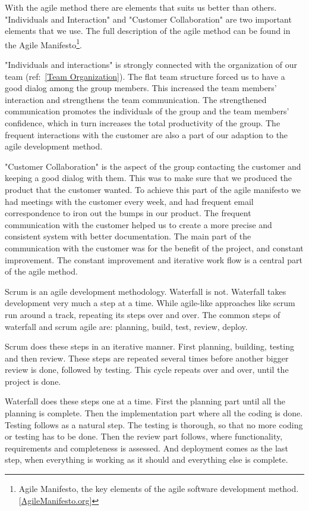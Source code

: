     With the agile method there are elements that suits us better than others. "Individuals and Interaction" and "Customer Collaboration" are two important elements that we use. The full description of the agile method can be found in the Agile Manifesto\footnote
        {Agile Manifesto, the key elements of the agile software development method. [\href{http://http://agilemanifesto.org/}{AgileManifesto.org}]}.
    
    "Individuals and interactions" is strongly connected with the organization of our team (ref:~\ref{Team Organization}). The flat team structure forced us to have a good dialog among the group members. This increased the team members' interaction and strengthens the team communication. The strengthened communication promotes the individuals of the group and the team members' confidence, which in turn increases the total productivity of the group. The frequent interactions with the customer are also a part of our adaption to the agile development method. 
    
    "Customer Collaboration" is the aspect of the group contacting the customer and keeping a good dialog with them. This was to make sure that we produced the product that the customer wanted. To achieve this part of the agile manifesto we had meetings with the customer every week, and had frequent email correspondence to iron out the bumps in our product. The frequent communication with the customer helped us to create a more precise and consistent system with better documentation. The main part of the communication with the customer was for the benefit of the project, and constant improvement. The constant improvement and iterative work flow is a central part of the agile method. 
    
    Scrum is an agile development methodology. Waterfall is not. Waterfall takes development very much a step at a time. While agile-like approaches like scrum run around a track, repeating its steps over and over. The common steps of waterfall and scrum agile are: planning, build, test, review, deploy. 
               
    Scrum does these steps in an iterative manner. First planning, building, testing and then review. These steps are repeated several times before another bigger review is done, followed by testing. This cycle repeats over and over, until the project is done. 
    
    Waterfall  does these steps one at a time. First the planning part until all the planning is complete. Then the implementation part where all the coding is done. Testing follows as a natural step. The testing is thorough, so that no more coding or testing has to be done. Then the review part follows, where functionality, requirements and completeness is assessed. And deployment comes as the last step, when everything is working as it should and everything else is complete.  
    
